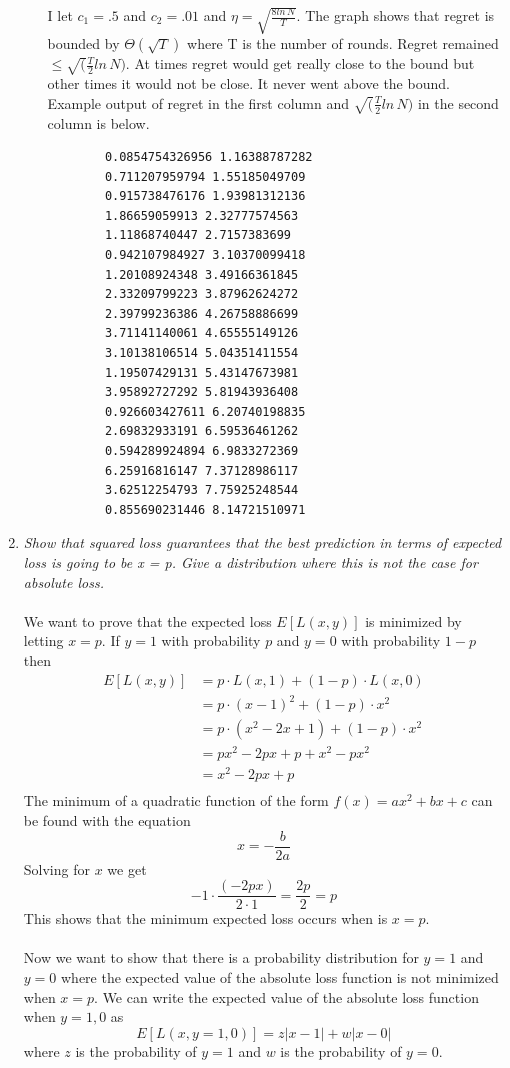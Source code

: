 \documentclass[12pt]{article}
\begin{document}
\begin{enumerate}
\begin{enumerate}
\begin{figure}[H]
  	    \end{figure}
  	    I let $c_1 = .5$ and $c_2 = .01$ and $\eta = \sqrt{\frac{8ln\,N}{T}}$. 
  	    The graph shows that regret is bounded by $\Theta{(\sqrt{T})}$ where T is the number of rounds. Regret remained
  	    $\le \sqrt(\frac{T}{2}ln\,N)$.  At times regret would get really close to
  	    the bound but other times it would not be close.  It never went above the
  	    bound. Example output of regret in the first column and
  	    $\sqrt(\frac{T}{2}ln\,N)$ in the second column is below.
  	    \scriptsize
  	    \begin{verbatim}
		0.0854754326956 1.16388787282
		0.711207959794 1.55185049709
		0.915738476176 1.93981312136
		1.86659059913 2.32777574563
		1.11868740447 2.7157383699
		0.942107984927 3.10370099418
		1.20108924348 3.49166361845
		2.33209799223 3.87962624272
		2.39799236386 4.26758886699
		3.71141140061 4.65555149126
		3.10138106514 5.04351411554
		1.19507429131 5.43147673981
		3.95892727292 5.81943936408
		0.926603427611 6.20740198835
		2.69832933191 6.59536461262
		0.594289924894 6.9833272369
		6.25916816147 7.37128986117
		3.62512254793 7.75925248544
		0.855690231446 8.14721510971
  	    \end{verbatim}
  	    \normalsize
  	\end{enumerate}
  	
  \newpage
  \item \textit{Show that squared loss guarantees that the best prediction
  in terms of expected loss is going to be x = p.  Give a distribution where
  this is not the case for absolute loss.}\\
  \\
  We want to prove that the expected loss $E[L(x,y)]$ is minimized by letting
  $x=p$.  If $y = 1$ with probability $p$ and $y = 0$ with probability $1-p$
  then 
  \begin{align*}
  E[L(x,y)] &= p \cdot L(x,1) + (1-p) \cdot L(x,0)\\
  &= p \cdot (x-1)^2 + (1-p) \cdot x^2\\
  &= p \cdot (x^2 - 2x + 1) + (1-p)\cdot x^2\\
  &= px^2 - 2px + p + x^2 - px^2\\
  & = x^2 - 2px + p\\
  \end{align*}
  The minimum of a quadratic function of the form $f(x) = ax^2 + bx +c$ can be
  found with the equation 
  $$
  x = -\frac{b}{2a}
  $$
  Solving for $x$ we get 
  $$
  -1 \cdot \frac{(-2px)}{2 \cdot 1} = \frac{2p}{2} = p
  $$
  This shows that the minimum expected loss occurs when is $x=p$.\\
  \\
  Now we want to show that there is a probability distribution for $y=1$ and
  $y=0$ where the expected value of the absolute loss function is not minimized
  when $x=p$.  We can write the expected value of the absolute loss function
  when $y=1,0$ as $$
  E[L(x,y=1,0)] = z|x-1| + w|x-0|
  $$
  where $z$ is the probability of $y=1$ and $w$ is the probability of $y=0$. 
  

\end{enumerate}
\end{document}
